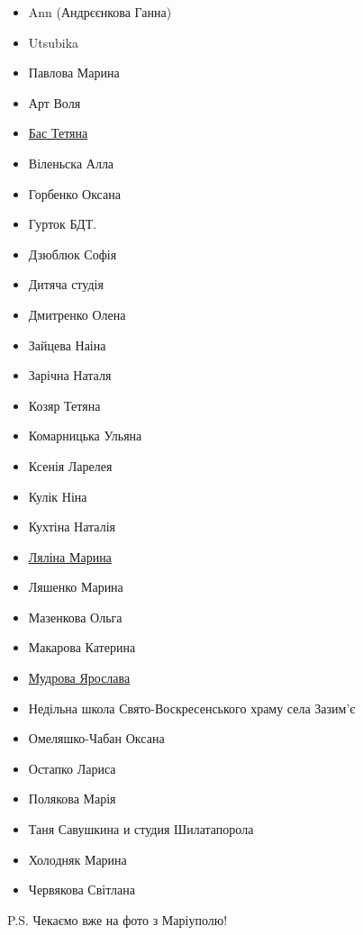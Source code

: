\begin{itemize}
  \item Ann (Андрєєнкова Ганна)
  \item Utsubika
  \item Павлова Марина
  \item Арт Воля
  \item \href{https://www.facebook.com/tatiana.bas.inspiration}{Бас Тетяна}
  \item Віленьска Алла
  \item Горбенко Оксана
  \item Гурток БДТ.
  \item Дзюблюк Софія
  \item Дитяча студія
  \item Дмитренко Олена
  \item Зайцева Наіна
  \item Зарічна Наталя
  \item Козяр Тетяна
  \item Комарницька Ульяна
  \item Ксенія Ларелея
  \item Кулік Ніна
  \item Кухтіна Наталія
  \item \href{https://www.facebook.com/lialimaart}{Ляліна Марина}
  \item Ляшенко Марина
  \item Мазенкова Ольга
  \item Макарова Катерина
  \item \href{https://www.facebook.com/profile.php?id=100007926423863}{Мудрова Ярослава}
  \item Недільна школа Свято-Воскресенського храму села Зазим'є
  \item Омеляшко-Чабан Оксана
  \item Остапко Лариса
  \item Полякова Марія
  \item Таня Савушкина и студия Шилатапорола
  \item Холодняк Марина
  \item Червякова Світлана
\end{itemize}

P.S. Чекаємо вже на фото з Маріуполю! 
